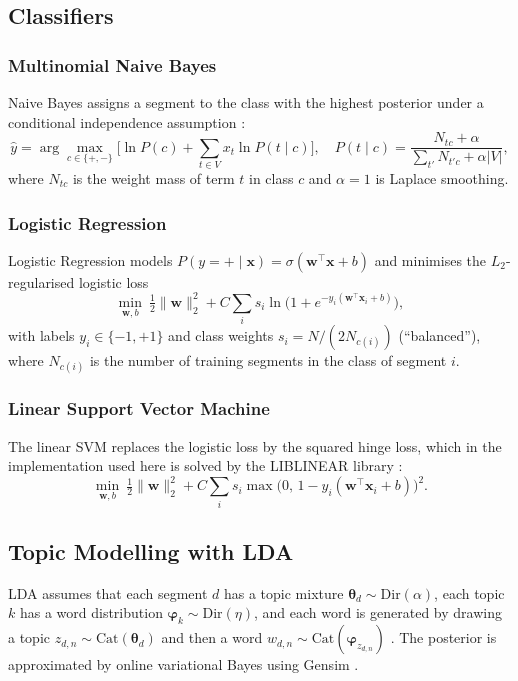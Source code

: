 \documentclass[11pt,journal,draftclsnofoot,onecolumn]{IEEEtran}
\begin{document}
\subsection{Classifiers}
\subsubsection{Multinomial Naive Bayes}
Naive Bayes assigns a segment to the class with the highest posterior under a conditional independence assumption \cite{mccallum1998}:
\begin{equation}
\hat{y}=\arg\max_{c\in\{+,-\}}\Big[\ln P(c)+\sum_{t\in V}x_{t}\ln P(t\mid c)\Big],\quad
P(t\mid c)=\frac{N_{tc}+\alpha}{\sum_{t'}N_{t'c}+\alpha|V|},
\end{equation}
where $N_{tc}$ is the weight mass of term $t$ in class $c$ and $\alpha=1$ is Laplace smoothing.

\subsubsection{Logistic Regression}
Logistic Regression models $P(y=+\mid\mathbf{x})=\sigma(\mathbf{w}^{\top}\mathbf{x}+b)$ and minimises the $L_2$-regularised logistic loss
\begin{equation}
\min_{\mathbf{w},b}\ \tfrac12\lVert\mathbf{w}\rVert_2^2+C\sum_{i}s_i\ln\!\big(1+e^{-y_i(\mathbf{w}^{\top}\mathbf{x}_i+b)}\big),
\end{equation}
with labels $y_i\in\{-1,+1\}$ and class weights $s_i=N/(2N_{c(i)})$ (``balanced''), where $N_{c(i)}$ is the number of training segments in the class of segment $i$.

\subsubsection{Linear Support Vector Machine}
The linear SVM \cite{joachims1998} replaces the logistic loss by the squared hinge loss, which in the implementation used here is solved by the LIBLINEAR library \cite{fan2008}:
\begin{equation}
\min_{\mathbf{w},b}\ \tfrac12\lVert\mathbf{w}\rVert_2^2+C\sum_{i}s_i\max\!\big(0,\,1-y_i(\mathbf{w}^{\top}\mathbf{x}_i+b)\big)^2 .
\end{equation}

\subsection{Topic Modelling with LDA}
LDA assumes that each segment $d$ has a topic mixture $\boldsymbol{\theta}_d\sim\mathrm{Dir}(\alpha)$, each topic $k$ has a word distribution $\boldsymbol{\varphi}_k\sim\mathrm{Dir}(\eta)$, and each word is generated by drawing a topic $z_{d,n}\sim\mathrm{Cat}(\boldsymbol{\theta}_d)$ and then a word $w_{d,n}\sim\mathrm{Cat}(\boldsymbol{\varphi}_{z_{d,n}})$ \cite{blei2003}. The posterior is approximated by online variational Bayes \cite{hoffman2010} using Gensim \cite{rehurek2010}.
\end{document}
